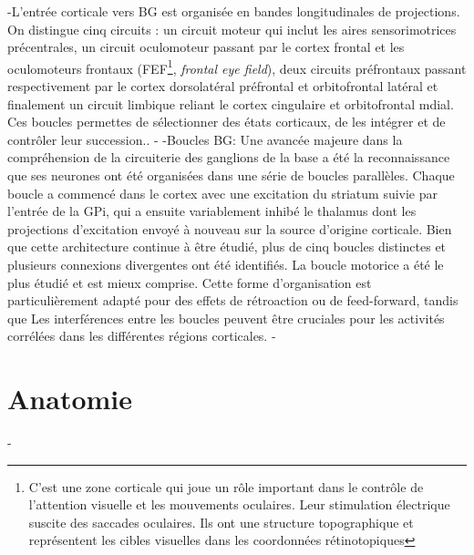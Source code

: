 -L'entrée corticale vers BG est organisée en bandes longitudinales de projections. On distingue cinq circuits : un circuit moteur qui inclut les aires sensorimotrices précentrales, un circuit oculomoteur passant par le cortex frontal et les oculomoteurs frontaux (FEF\footnote{ C'est une zone corticale qui joue un rôle important dans le contrôle de l'attention visuelle et les mouvements oculaires. Leur stimulation électrique suscite des saccades oculaires. Ils ont une structure topographique et représentent les cibles visuelles dans les coordonnées rétinotopiques}, \textit{frontal eye field}), deux circuits préfrontaux passant respectivement par le cortex dorsolatéral préfrontal et orbitofrontal latéral et finalement un circuit limbique reliant le cortex cingulaire et orbitofrontal mdial. \citep{Alexander et crutcher 1990} Ces boucles permettes de sélectionner des états corticaux, de les intégrer et de contrôler leur succession..\citep{Berns and Sejnowski 1996,1998, Beiser and houk 1998, NAKAHARA Doya and Hikosaka 1999, 2001}
-%
-Boucles BG: Une avancée majeure dans la compréhension de la circuiterie des ganglions de la base a été la reconnaissance que ses neurones ont été organisées dans une série de boucles parallèles. Chaque boucle a commencé dans le cortex avec une excitation du striatum suivie par l'entrée de la GPi, qui a ensuite variablement inhibé le thalamus dont les projections d'excitation envoyé à nouveau sur la source d'origine corticale. Bien que cette architecture continue à être étudié, plus de cinq boucles distinctes et plusieurs connexions divergentes ont été identifiés. La boucle motorice a été le plus étudié et est mieux comprise. Cette forme d'organisation est particulièrement adapté pour des effets de rétroaction ou de feed-forward, tandis que Les interférences entre les boucles peuvent être cruciales pour les activités corrélées dans les différentes régions corticales.%
-
 \section {Anatomie}
-%
 

